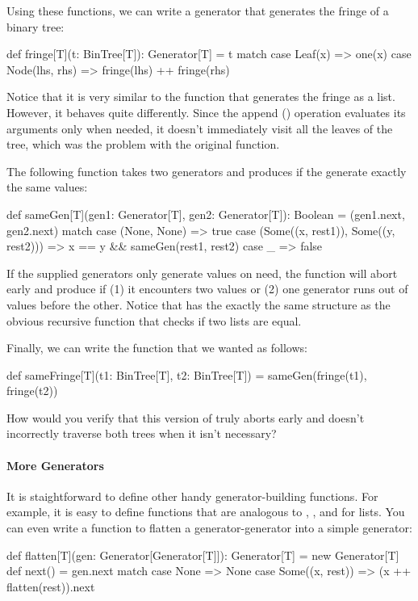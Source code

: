 \documentclass[9pt]{extbook}
\begin{document}
Using these functions, we can write a generator that generates the fringe of a binary tree:
%
\begin{scalacode}
def fringe[T](t: BinTree[T]): Generator[T] = t match {
  case Leaf(x) => one(x)
  case Node(lhs, rhs) => fringe(lhs) ++ fringe(rhs)
}
\end{scalacode}
%
Notice that it is very similar to the function that generates the fringe as a list. However, it behaves quite differently.
Since the append (\scalainline{++}) operation evaluates its arguments only when needed, it doesn't immediately visit all the
leaves of the tree, which was the problem with the original function.

The following function takes two generators and produces  if the  generate exactly the same values:
\begin{scalacode}
def sameGen[T](gen1: Generator[T], gen2: Generator[T]): Boolean = (gen1.next, gen2.next) match {
  case (None, None) => true
  case (Some((x, rest1)), Some((y, rest2))) => x == y && sameGen(rest1, rest2)
  case _ => false
}
\end{scalacode}
If the supplied generators only generate values on need, the  function will abort early and produce
 if (1) it  encounters two values  or (2) one generator runs out of values before 
the other. Notice that  has the exactly the same structure as the obvious recursive function that
checks if two lists are equal.

Finally, we can write the  function that we wanted as follows:
\begin{scalacode}
def sameFringe[T](t1: BinTree[T], t2: BinTree[T]) = sameGen(fringe(t1), fringe(t2))
\end{scalacode}

\begin{think}
How would you verify that this version of  truly aborts early and doesn't incorrectly traverse both
trees when it isn't necessary?
\end{think}

\paragraph{More Generators}

It is staightforward to define other handy generator-building functions. For example, it is easy to define functions
that are analogous to , , and  for lists. You can even write
a function to flatten a generator-generator into a simple generator:
\begin{scalacode}
def flatten[T](gen: Generator[Generator[T]]): Generator[T] = new Generator[T] {
  def next() = gen.next match {
    case None => None
    case Some((x, rest)) => (x ++ flatten(rest)).next
  }
}
\end{scalacode}
\end{document}
